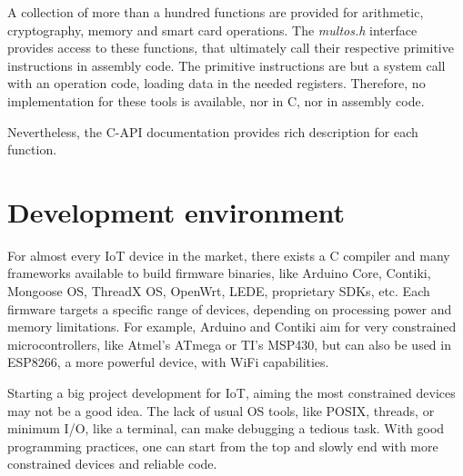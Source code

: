 A collection of more than a hundred functions are provided for arithmetic, cryptography, memory and smart card operations. The \textit{multos.h} interface provides access to these functions, that ultimately call their respective primitive instructions in assembly code. The primitive instructions are but a system call with an operation code, loading data in the needed registers. Therefore,  no implementation for these tools is available, nor in C, nor in assembly code.

Nevertheless, the C-API documentation \citep{MultosTechLib} provides rich description for each function.




\hfil

\section{Development environment}


For almost every IoT device in the market, there exists a C compiler and many frameworks available to build firmware binaries, like Arduino Core, Contiki, Mongoose OS, ThreadX OS, OpenWrt, LEDE, proprietary SDKs, etc. Each firmware targets a specific range of devices, depending on processing power and memory limitations. For example, Arduino and Contiki aim for very constrained microcontrollers, like Atmel's ATmega or TI's MSP430, but can also be used in ESP8266, a more powerful device, with WiFi capabilities.

Starting a big project development for \ac{IoT}, aiming the most constrained devices may not be a good idea. The lack of usual OS tools, like POSIX, threads, or minimum I/O, like a terminal, can make debugging a tedious task. With good programming practices, one can start from the top and slowly end with more constrained devices and reliable code.


